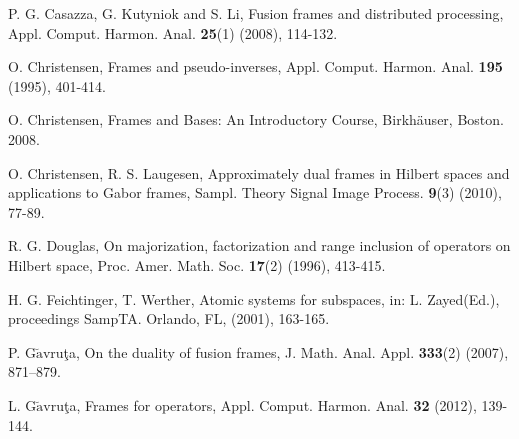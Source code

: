 \documentclass{birkjour}
\theoremstyle{definition}
\theoremstyle{remark}
\numberwithin{equation}{section}
\begin{document}
\begin{thebibliography}{10}
 P. G. Casazza, G. Kutyniok and S. Li, Fusion frames and distributed processing, Appl. Comput. Harmon. Anal. \textbf{25}(1) (2008), 114-132.



 O. Christensen, Frames and pseudo-inverses,  Appl. Comput. Harmon. Anal. \textbf{195} (1995), 401-414.


 O. Christensen, Frames and Bases: An Introductory Course,
Birkh\"{a}user, Boston. 2008.





  O. Christensen, R. S. Laugesen, Approximately dual frames in Hilbert spaces and applications to Gabor frames, Sampl. Theory Signal Image Process.
\textbf{9}(3) (2010), 77-89.

 R. G. Douglas, On majorization, factorization and range inclusion of operators on Hilbert space, Proc. Amer. Math. Soc. {\bf 17}(2) (1996), 413-415.









 H. G. Feichtinger, T. Werther, Atomic systems for subspaces, in: L. Zayed(Ed.), proceedings SampTA. Orlando, FL, (2001), 163-165.


 P. G$\breve{\textrm{a}}$vru\c{t}a,  On the duality of fusion frames, J. Math. Anal.
Appl. {\bf 333}(2) (2007), 871--879.

 L. G$\breve{\textrm{a}}$vru\c{t}a, Frames for operators, Appl. Comput. Harmon. Anal. {\bf 32} (2012), 139-144.


\end{thebibliography}
\end{document}

